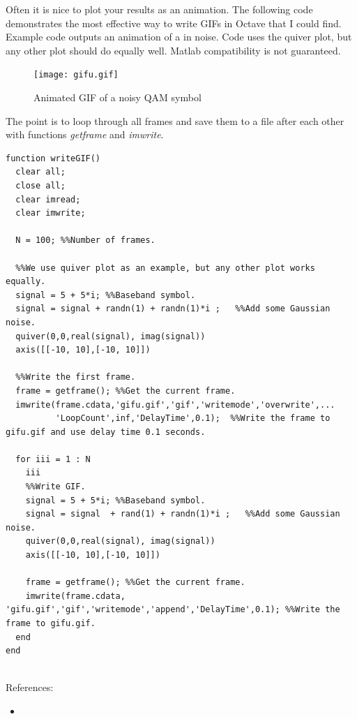 \documentclass{article}
\begin{document}
Often it is nice to plot your results as an animation. The following code demonstrates the most effective way to write GIFs in Octave that I could find. Example code outputs an animation of a  in noise. Code uses the quiver plot, but any other plot should do equally well. Matlab compatibility is not guaranteed.

\begin{figure}
  \texttt{[image: gifu.gif]}
  \caption{Animated GIF of a noisy QAM symbol}
\end{figure}


The point is to loop through all frames and save them to a file after each other with functions \textit{getframe} and \textit{imwrite}. 

\begin{verbatim}
function writeGIF()
  clear all;
  close all;
  clear imread;
  clear imwrite;
  
  N = 100; %%Number of frames.

  %%We use quiver plot as an example, but any other plot works equally.
  signal = 5 + 5*i; %%Baseband symbol.
  signal = signal + randn(1) + randn(1)*i ;   %%Add some Gaussian noise.
  quiver(0,0,real(signal), imag(signal))
  axis([[-10, 10],[-10, 10]])

  %%Write the first frame.
  frame = getframe(); %%Get the current frame.
  imwrite(frame.cdata,'gifu.gif','gif','writemode','overwrite',...
          'LoopCount',inf,'DelayTime',0.1);  %%Write the frame to gifu.gif and use delay time 0.1 seconds.
  
  for iii = 1 : N
    iii
    %%Write GIF.
    signal = 5 + 5*i; %%Baseband symbol.
    signal = signal  + rand(1) + randn(1)*i ;   %%Add some Gaussian noise.
    quiver(0,0,real(signal), imag(signal))
    axis([[-10, 10],[-10, 10]])
    
    frame = getframe(); %%Get the current frame.
    imwrite(frame.cdata, 'gifu.gif','gif','writemode','append','DelayTime',0.1); %%Write the frame to gifu.gif.
  end
end


\end{verbatim}

References: 
\begin{itemize}
\item {}
\end{itemize}
\end{document}
